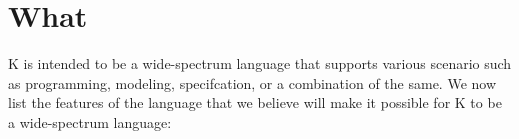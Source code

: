 \documentclass{llncs}
\newcommand{\lang}{K}
\begin{document}

\section{What}

\lang{} is intended to be a wide-spectrum language that supports
various scenario such as programming, modeling, specifcation, or a
combination of the same. We now list the features of the language that
we believe will make it possible for \lang{} to be a wide-spectrum
language:

\end{document}
